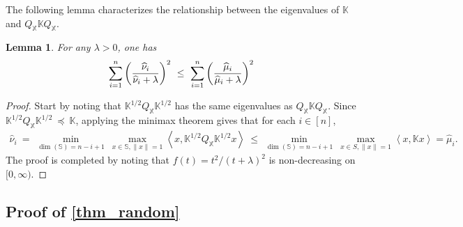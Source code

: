 \documentclass[11pt,twoside]{article}
\newtheorem{lemma}{Lemma}
\def\KK{\mathbb{K}}
\def\XX{\mathbb{X}}
\def\SS{\mathbb{S}}
\def\wh{\widehat}
\def\l{\left}
\def\r{\right}
\begin{document}
The following lemma characterizes the relationship between the eigenvalues of $\KK$ and $Q_{\XX} \KK Q_{\XX}$.   

\begin{lemma}\label{lem_comp}
For any $\lambda>0$, one has 
\[
  \sum_{i=1}^n  \left(\wh\nu_i \over \wh\nu_i + \lambda\right)^2~ \le  ~  \sum_{i=1}^n  \left(\wh\mu_i \over \wh\mu_i + \lambda \right)^2 
\]
\end{lemma}
\begin{proof}
Start by noting that $\KK^{1/2} Q_{\XX} \KK^{1/2} $  has the same eigenvalues as $ Q_{\XX} \KK Q_{\XX} $. 
Since 
$\KK^{1/2} Q_{\XX} \KK^{1/2} ~\preceq~  \KK $, applying the 
minimax theorem 
gives that for each $i\in [n]$, 
\begin{align*}
    \wh\nu_i   ~=~ \min_{\dim(\SS) = n-i+1}~  \max _{x\in \SS,\|x\|=1} \l\langle x , \KK^{1/2} Q_{\XX} \KK^{1/2}   x\r \rangle  ~  \le ~
\min_{\dim(\SS) = n-i+1}~  \max _{x\in S,\|x\|=1} \l\langle x , \KK    x\r \rangle =\wh\mu_i .  
\end{align*}
The proof is completed by noting that $f(t) = t^2 / (t+\lambda)^2$ is non-decreasing on $[0,\infty)$. 
\end{proof}


\subsection{Proof of \texorpdfstring{\cref{thm_random}}{\texttwoinferior}}\label{app_proof_thm_random}
\end{document}
